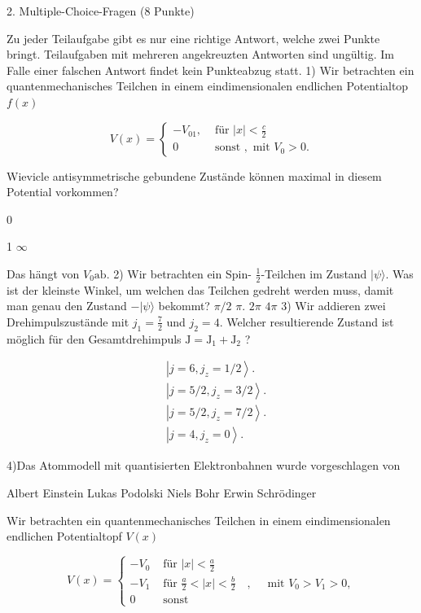 \documentclass[11pt,a4paper]{article}
\begin{document}
2. Multiple-Choice-Fragen (8 Punkte)

Zu jeder Teilaufgabe gibt es nur eine richtige Antwort, welche zwei Punkte bringt. Teilaufgaben mit mehreren angekreuzten Antworten sind ungültig. Im Falle einer falschen Antwort findet kein Punkteabzug statt.
1) Wir betrachten ein quantenmechanisches Teilchen in einem eindimensionalen endlichen Potentialtop $f(x)$

$$
V(x)= \begin{cases}-V_{01}, & \text { für }|x|<\frac{c}{2} \\ 0 & \text { sonst }, \text { mit } V_0>0 .\end{cases}
$$


Wievicle antisymmetrische gebundene Zustände können maximal in diesem Potential vorkommen?

0

1
$\infty$

Das hängt von $V_0 \mathrm{ab}$.
2) Wir betrachten ein Spin- $\frac{1}{2}$-Teilchen im Zustand $|\psi\rangle$. Was ist der kleinste Winkel, um welchen das Teilchen gedreht werden muss, damit man genau den Zustand $-|\psi\rangle$ bekommt?
$\pi / 2$
$\pi$.
$2 \pi$
$4 \pi$
3) Wir addieren zwei Drehimpulszustände mit $j_1=\frac{7}{2}$ und $j_2=4$. Welcher resultierende Zustand ist möglich für den Gesamtdrehimpuls $\mathrm{J}=\mathrm{J}_1+\mathrm{J}_2$ ?

$$
\begin{aligned}
& \left|j=6, j_z=1 / 2\right\rangle . \\
& \left|j=5 / 2, j_z=3 / 2\right\rangle . \\
& \left|j=5 / 2, j_z=7 / 2\right\rangle . \\
& \left|j=4, j_z=0\right\rangle .
\end{aligned}
$$

4)Das Atommodell mit quantisierten Elektronbahnen wurde vorgeschlagen von

Albert Einstein
Lukas Podolski
Niels Bohr
Erwin Schrödinger


Wir betrachten ein quantenmechanisches Teilchen in einem eindimensionalen endlichen Potentialtopf $V(x)$

$$
V(x)= \begin{cases}-V_0 & \text { für }|x|<\frac{a}{2} \\ -V_1 & \text { für } \frac{a}{2}<|x|<\frac{b}{2} \quad, \quad \text { mit } V_0>V_1>0, \\ 0 & \text { sonst }\end{cases}
$$
\end{document}

